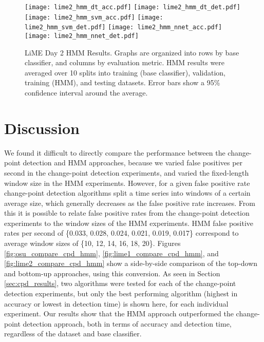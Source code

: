 \begin{figure}[H]
 \centering
 \texttt{[image: lime2\_hmm\_dt\_acc.pdf]} \hspace{1em}\vspace{1em}
 \texttt{[image: lime2\_hmm\_dt\_det.pdf]}
 \texttt{[image: lime2\_hmm\_svm\_acc.pdf]} \hspace{1em}\vspace{1em}
 \texttt{[image: lime2\_hmm\_svm\_det.pdf]}
 \texttt{[image: lime2\_hmm\_nnet\_acc.pdf]} \hspace{1em}
 \texttt{[image: lime2\_hmm\_nnet\_det.pdf]}
 \caption{LiME Day 2 HMM Results.
  Graphs are organized into rows by base classifier, and columns by evaluation
  metric. HMM results were averaged over 10 splits into training
  (base classifier), validation, training (HMM), and testing datasets. Error
  bars show a 95\% confidence interval around the average.}
 \label{fig:lime2_hmm}
\end{figure}

\newpage

\section{Discussion}

We found it difficult to directly compare the performance between the change-
point detection and HMM approaches, because we
varied false positives per second in the change-point detection experiments,
and varied the fixed-length window size in the HMM experiments.
However, for a given false positive rate change-point
detection algorithms split a time series into windows of a certain average size,
which generally decreases as the false positive rate increases. From this it is possible
to relate false positive rates from the change-point detection experiments to
the window sizes of the HMM experiments. HMM false positive rates per second of
\{0.033, 0.028, 0.024, 0.021, 0.019, 0.017\} correspond to average
window sizes of \{10, 12, 14, 16, 18, 20\}. Figures \ref{fig:osu_compare_cpd_hmm},
\ref{fig:lime1_compare_cpd_hmm}, and \ref{fig:lime2_compare_cpd_hmm}
show a side-by-side comparison of the top-down and bottom-up approaches, using
this conversion. As seen in Section \ref{sec:cpd_results}, two algorithms 
were tested for each of the change-point detection experiments, but only the
best performing algorithm (highest in accuracy or lowest in detection time) is 
shown here, for each individual experiment.
Our results show that the HMM approach outperformed the change-point
detection approach, both in terms of accuracy
and detection time, regardless of
the dataset and base classifier.

